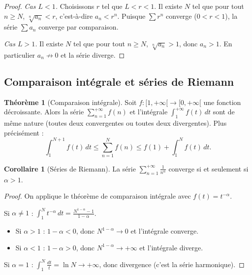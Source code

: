 \documentclass[12pt,a4paper,openany]{book}
\theoremstyle{definition}
\newtheorem{theoreme}{Théorème}[chapter]
\newtheorem{corollaire}{Corollaire}[chapter]
\begin{document}
\begin{proof}
  \textit{Cas $L < 1$.} Choisissons $r$ tel que $L < r < 1$. Il existe $N$ tel que pour
  tout $n \geq N$, $\sqrt[n]{a_n} < r$, c'est-à-dire $a_n < r^n$.
  Puisque $\sum r^n$ converge ($0 < r < 1$), la série $\sum a_n$ converge par comparaison.

  \textit{Cas $L > 1$.} Il existe $N$ tel que pour tout $n \geq N$, $\sqrt[n]{a_n} > 1$,
  donc $a_n > 1$. En particulier $a_n \not\to 0$ et la série diverge.
\end{proof}

\subsection{Comparaison intégrale et séries de Riemann}

\begin{theoreme}[Comparaison intégrale]\label{thm:comparaison-integrale}
  Soit $f : [1, +\infty[ \to [0, +\infty[$ une fonction décroissante. Alors la série
  $\sum_{n=1}^{+\infty} f(n)$ et l'intégrale $\int_1^{+\infty} f(t)\,dt$ sont de même
  nature (toutes deux convergentes ou toutes deux divergentes). Plus précisément :
  \[
    \int_1^{N+1} f(t)\,dt \leq \sum_{n=1}^{N} f(n) \leq f(1) + \int_1^{N} f(t)\,dt.
  \]
\end{theoreme}

\begin{corollaire}[Séries de Riemann]\label{cor:riemann}
  La série $\sum_{n=1}^{+\infty} \frac{1}{n^\alpha}$ converge si et seulement si $\alpha > 1$.
\end{corollaire}

\begin{proof}
  On applique le théorème de comparaison intégrale avec $f(t) = t^{-\alpha}$.

  Si $\alpha \neq 1$ : $\int_1^N t^{-\alpha}\,dt = \frac{N^{1-\alpha} - 1}{1 - \alpha}$.
  \begin{itemize}
    \item Si $\alpha > 1$ : $1 - \alpha < 0$, donc $N^{1-\alpha} \to 0$ et l'intégrale converge.
    \item Si $\alpha < 1$ : $1 - \alpha > 0$, donc $N^{1-\alpha} \to +\infty$ et l'intégrale diverge.
  \end{itemize}
  Si $\alpha = 1$ : $\int_1^N \frac{dt}{t} = \ln N \to +\infty$, donc divergence
  (c'est la série harmonique).
\end{proof}
\end{document}
